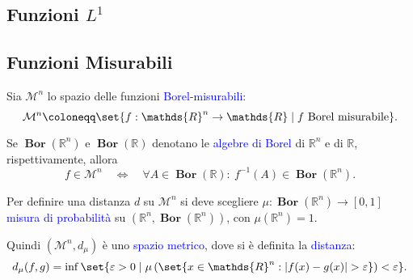 \documentclass[10pt]{book}
\newcommand{\1}{\mathds{1}}
\newcommand{\R}{\mathds{R}}
\theoremstyle{definition}%
\theoremstyle{plain}
\theoremstyle{remark}
\renewcommand{\href}[2]{\textcolor{blue}{#2}}
\begin{document}
\subsection{Funzioni \(L^{1}\)}
\label{sec:org8a65fe5}

\subsection{Funzioni Misurabili}
\label{sec:orgda5b527}

Sia \(\mathcal{M}^{n}\) lo spazio delle funzioni \href{../../../../../org/roam/20250704104938-algebra_di_borel.org}{Borel}-\href{../../../../../org/roam/20250704104947-funzione_misurabile.org}{misurabili}:
\begin{equation*}
\mathcal{M}^{n}\coloneqq \set{f:\R^{n}\to \R\mid f\text{ Borel misurabile}}.
\end{equation*}

Se \(\bm{{\operatorname{Bor}}}(\R^{n})\) e \(\bm{{\operatorname{Bor}}}(\R)\) denotano le \href{../../../../../org/roam/20250704104938-algebra_di_borel.org}{algebre di Borel} di \(\R^{n}\) e di \(\R\), rispettivamente, allora
\begin{equation*}
f \in \mathcal{M}^{n}\quad \iff\quad \forall A \in \bm{{\operatorname{Bor}}}(\R): \ f^{-1}(A) \in \bm{{\operatorname{Bor}}}(\R^{n}).
\end{equation*}

Per definire una distanza \(d\) su \(\mathcal{M}^{n}\) si deve scegliere \(\mu:\bm{{\operatorname{Bor}}}(\R^{n})\to [0,1]\) \href{../../../../../org/roam/20250704105515-misura_di_probabilita.org}{misura di probabilità} su \(\left(\R^{n}, \bm{{\operatorname{Bor}}}(\R^{n})\right)\), con \(\mu(\R^{n})=1\).

Quindi \((\mathcal{M}^{n},d_{\mu})\) è uno \href{../../../../../org/roam/20250301193511-spazio_metrico.org}{spazio metrico}, dove si è definita la \href{../../../../../org/roam/20250301193511-spazio_metrico.org}{distanza}:
\begin{equation*}
d_{\mu}(f,g) = \inf\set{\varepsilon>0\mid \mu\left(\set{x \in \R^{n}: |f(x)-g(x)|>\varepsilon}\right)<\varepsilon}.
\end{equation*}
\end{document}
